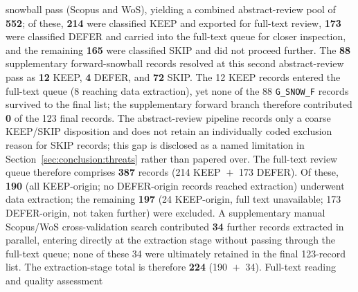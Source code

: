 snowball pass (Scopus and WoS), yielding a combined abstract-review pool of
\textbf{552}; of these, \textbf{214} were classified KEEP and exported for
full-text review, \textbf{173} were classified DEFER and carried into the
full-text queue for closer inspection, and the remaining \textbf{165} were
classified SKIP and did not proceed further. The \textbf{88} supplementary forward-snowball records
resolved at this second abstract-review pass as \textbf{12} KEEP, \textbf{4}
DEFER, and \textbf{72} SKIP. The 12 KEEP records entered the full-text queue
(8 reaching data extraction), yet none of the 88 \texttt{G\_SNOW\_F} records
survived to the final list; the supplementary forward branch therefore
contributed \textbf{0} of the 123 final records. %
The abstract-review pipeline records only a coarse KEEP/SKIP disposition and
does not retain an individually coded exclusion reason for SKIP records; this
gap is disclosed as a named limitation in
Section~\ref{sec:conclusion:threats} rather than papered over. The full-text
review queue therefore comprises \textbf{387} records (214 KEEP
${}+{}$ 173 DEFER). Of these, \textbf{190} (all KEEP-origin; no DEFER-origin
records reached extraction) underwent data extraction; the remaining
\textbf{197} (24 KEEP-origin, full text unavailable; 173 DEFER-origin, not
taken further) were excluded.
A supplementary manual Scopus/WoS cross-validation search contributed
\textbf{34} further records extracted in parallel, entering directly at the
extraction stage without passing through the full-text queue; none of these
34 were ultimately retained in the final 123-record list. The extraction-stage
total is therefore \textbf{224} (190 ${}+{}$ 34). Full-text reading and quality assessment
